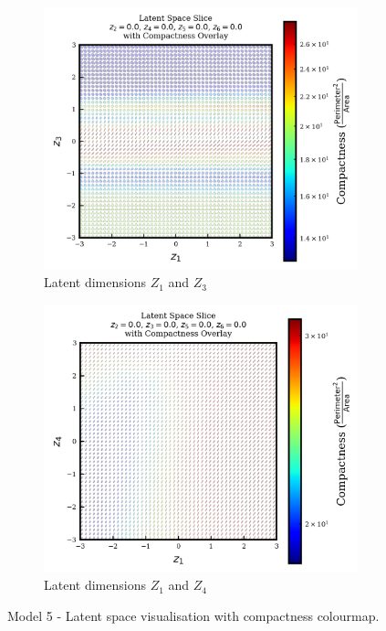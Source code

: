 \documentclass{article}
\begin{document}
\begin{figure}[H]
  \vspace{0.5em}

  \begin{subfigure}{0.48\textwidth}
    \centering
    \includegraphics[width=\textwidth]{figures/VAEmodels/model5/varying_z1_z3_fixed_z2=0.0_z4=0.0_z5=0.0_z6=0.0.png}
    \caption{Latent dimensions $Z_1$ and $Z_3$}
    \label{fig:model5_z1_z3}
  \end{subfigure}
  \hfill
  \begin{subfigure}{0.48\textwidth}
    \centering
    \includegraphics[width=\textwidth]{figures/VAEmodels/model5/varying_z1_z4_fixed_z2=0.0_z3=0.0_z5=0.0_z6=0.0.png}
    \caption{Latent dimensions $Z_1$ and $Z_4$}
    \label{fig:model5_z1_z4}
  \end{subfigure}

  \caption{Model 5 - Latent space visualisation with compactness colourmap.}
  \label{fig:model5_latent_visualisations}
\end{figure}
\end{document}
